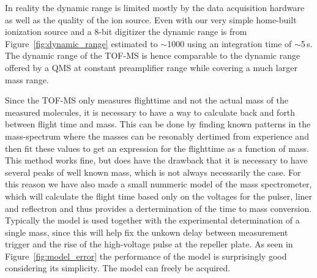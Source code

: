 \documentclass[aip,rsi]{revtex4-1}
\begin{document}
In reality the dynamic range is limited mostly by the data acquisition hardware as well as the quality of the ion source. Even with our very simple home-built ionization source and a 8-bit digitizer the dynamic range is from Figure~\ref{fig:dynamic_range} estimated to $\sim$1000 using an integration time of $\sim$5\,s. The dynamic range of the TOF-MS is hence comparable to the dynamic range offered by a QMS at constant preamplifier range while covering a much larger mass range.

Since the TOF-MS only measures flighttime and not the actual mass of the measured molecules, it is necessary to have a way to calculate back and forth between flight time and mass. This can be done by finding known patterns in the mass-spectrum where the masses can be resonably dertimed from experience and then fit these values to get an expression for the flighttime as a function of mass. This method works fine, but does have the drawback that it is necessary to have several peaks of well known mass, which is not always necessarily the case. For this reason we have also made a small nummeric model of the mass spectrometer, which will calculate the flight time based only on the voltages for the pulser, liner and reflectron and thus provides a dertermination of the time to mass conversion. Typically the model is used together with the experimental determination of a single mass, since this will help fix the unkown delay between measurement trigger and the rise of the high-voltage pulse at the repeller plate. As seen in Figure~\ref{fig:model_error} the performance of the model is surprisingly good considering its simplicity. The model can freely be acquired\cite{ModelGithub}.
\end{document}
